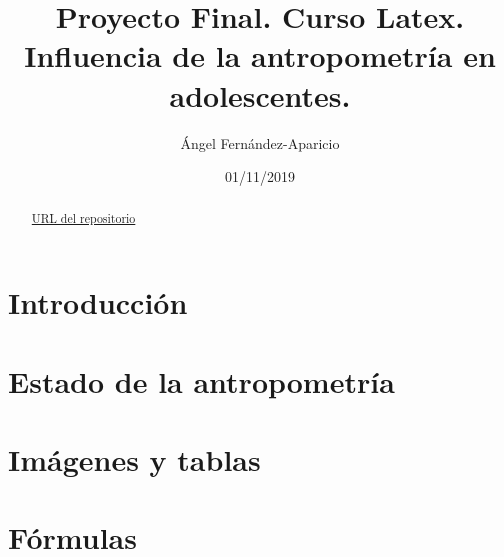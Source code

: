 \documentclass[a4paper,11pt]{article}
\begin{document}
\begin{titlepage}
	\title{Proyecto Final. Curso Latex. Influencia de la antropometría en adolescentes. }
	\author{Ángel Fernández-Aparicio}
	\date{01/11/2019}
	\maketitle
\end{titlepage}
\begin{abstract}
\href{https://github.com/anfeapa/proyecto_final}{URL del repositorio}
\end{abstract}
\section{Introducción}

\section{Estado de la antropometría}

\section{Imágenes y tablas}

\section{Fórmulas}
\end{document}
